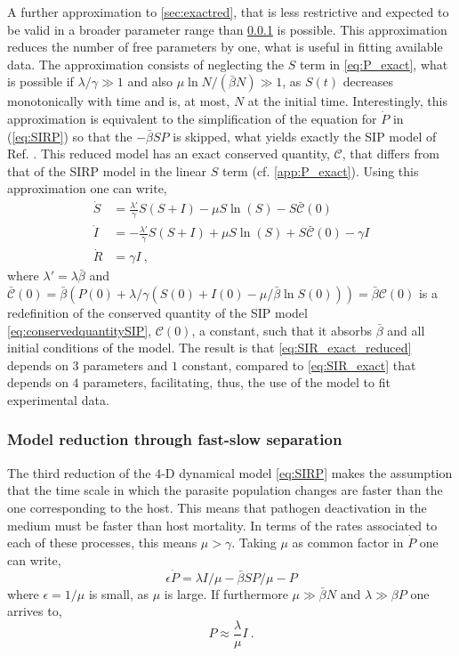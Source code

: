 A further approximation to \cref{sec:exactred}, that is less restrictive
and expected to be valid in a broader parameter range than \cref{sec:fastslow}
is possible. This approximation reduces the number of free parameters by one,
what is useful in fitting available data.
The approximation consists of neglecting the
$S$ term in \cref{eq:P_exact}, what is possible if $\lambda/\gamma\gg 1$
and also $\mu\ln N/(\bar{\beta} N)\gg 1$, as $S(t)$ decreases monotonically
with time and is, at most, $N$ at the initial time. Interestingly, this
approximation is equivalent to the simplification of the equation for $\dot{P}$
in (\ref{eq:SIRP}) so that the $-\bar{\beta}SP$ is skipped, what yields exactly
the SIP model of Ref. \cite{article_SIP}. This reduced model has an exact
conserved quantity, $\mathcal{C}$, that differs from that of the SIRP model in
the linear $S$ term (cf. \ref{app:P_exact}).
Using this approximation one can write,
\begin{equation}\label{eq:SIR_exact_reduced}
    \begin{aligned}
        \dot{S} & =\frac{\lambda'}{\gamma}S(S+I)-\mu
        S\ln(S)-S\bar{\mathcal{C}}(0)                 \\
        \dot{I} & =-\frac{\lambda'}{\gamma}S(S+I)+\mu
        S\ln(S)+S\bar{\mathcal{C}}(0)-\gamma I        \\
        \dot{R} & =\gamma I \ ,
    \end{aligned}
\end{equation}
where $\lambda'=\lambda\bar{\beta}$ and $\bar{\mathcal{C}}(0)=\bar{\beta}
    (P(0)+\lambda/\gamma(S(0)+I(0)-\mu/\bar{\beta}\ln S(0)))=\bar{\beta}
    \mathcal{C}(0)$ is a redefinition of the conserved quantity of the SIP
model
\cref{eq:conservedquantitySIP}, $\mathcal{C}(0)$, a constant, such that it
absorbs $\bar{\beta}$ and all initial conditions of the model. The result is
that \cref{eq:SIR_exact_reduced} depends on $3$ parameters and $1$ constant,
compared to \cref{eq:SIR_exact} that depends on $4$ parameters,
facilitating, thus, the use of the model to fit experimental data.

\subsubsection{Model reduction through fast-slow separation}
\label{sec:fastslow}

The third
reduction of the $4$-D dynamical model \cref{eq:SIRP} makes the assumption
that
the time scale in which the parasite population changes are faster than the
one corresponding to the host. This means that pathogen deactivation in the
medium must be faster than host mortality. In terms of the rates associated to
each of these processes, this means $\mu>\gamma$. Taking $\mu$ as common factor
in $\dot{P}$ one can write,
\begin{equation}
    \epsilon \dot{P} =\lambda I/\mu-\bar{\beta}SP/\mu-P
\end{equation}
where $\epsilon=1/\mu$ is small, as $\mu$ is large. If furthermore
$\mu\gg\bar{\beta}N$ and  $\lambda\gg \beta P$ one arrives to,
\begin{equation}\label{eq:P_approx}
    P\approx \frac{\lambda}{\mu} I \ .
\end{equation}

